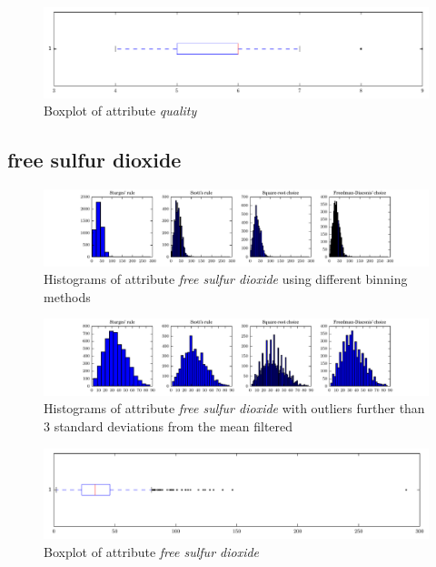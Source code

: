 \documentclass{report}
\begin{document}
\begin{figure}[H]
\includegraphics[width=\textwidth]{boxplots/quality.pdf}
\caption{Boxplot of attribute \emph{quality}}\end{figure}

\newpage\subsection{free sulfur dioxide}
\begin{figure}[H]
\includegraphics[width=\textwidth]{histograms/free_sulfur_dioxide.pdf}
\caption{Histograms of attribute \emph{free sulfur dioxide} using different binning methods}\end{figure}

\begin{figure}[H]
\includegraphics[width=\textwidth]{histograms/free_sulfur_dioxide_filtered.pdf}
\caption{Histograms of attribute \emph{free sulfur dioxide} with outliers further than 3 standard deviations from the mean filtered}\n\end{figure}

\begin{figure}[H]
\includegraphics[width=\textwidth]{boxplots/free_sulfur_dioxide.pdf}
\caption{Boxplot of attribute \emph{free sulfur dioxide}}\end{figure}
\end{document}
